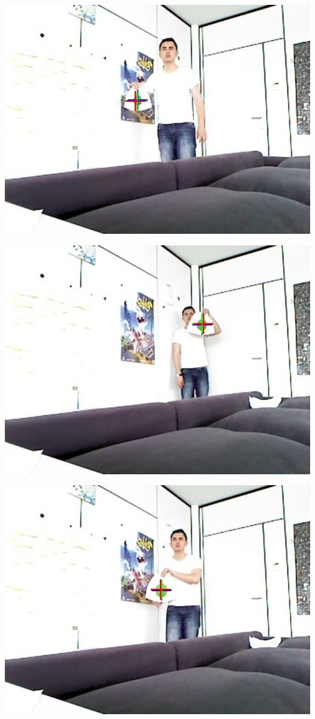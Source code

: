 \begin{center}
	\includegraphics[scale=0.6]{images/compare_output/rgb_image_10.jpg}
\end{center}

\begin{center}
	\includegraphics[scale=0.6]{images/compare_output/rgb_image_20.jpg}
\end{center}

\begin{center}
	\includegraphics[scale=0.6]{images/compare_output/rgb_image_24.jpg}
\end{center}